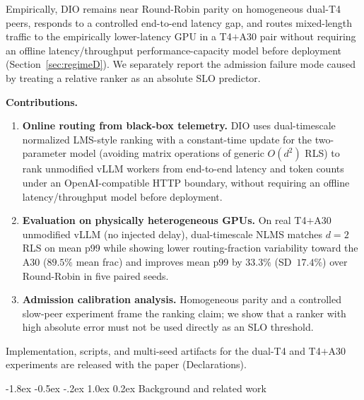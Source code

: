 \documentclass[pdflatex,sn-mathphys-num]{sn-jnl}
\makeatletter
\renewcommand{\paragraph}[1]{\par\smallskip\noindent\textbf{#1.}\ }
\renewcommand{\section}{\@startsection{section}{1}{\z@}%
  {-1.8ex \@plus -0.5ex \@minus -.2ex}%
  {1.0ex \@plus 0.2ex}%
  {\normalfont\large\bfseries}}%
\makeatother
\begin{document}
Empirically, DIO remains near Round-Robin parity on homogeneous dual-T4 peers,
responds to a controlled end-to-end latency gap, and routes mixed-length traffic
to the empirically lower-latency GPU in a T4$+$A30 pair without requiring an offline
latency/throughput performance-capacity model before deployment
(Section~\ref{sec:regimeD}). We separately report the admission failure mode caused
by treating a relative ranker as an absolute SLO predictor.

\paragraph{Contributions}
\begin{enumerate}
\item \textbf{Online routing from black-box telemetry.} DIO uses dual-timescale
normalized LMS-style ranking with a constant-time update for the two-parameter
model (avoiding matrix operations of generic $O(d^2)$ RLS) to rank unmodified
vLLM workers from end-to-end latency and token counts under an OpenAI-compatible
HTTP boundary, without requiring an offline latency/throughput model before
deployment.
\item \textbf{Evaluation on physically heterogeneous GPUs.} On real T4$+$A30
unmodified vLLM (no injected delay), dual-timescale NLMS matches $d{=}2$ RLS on
mean p99 while showing lower routing-fraction variability toward the A30
($89.5\%$ mean frac) and improves mean p99 by $33.3\%$ (SD~$17.4\%$) over
Round-Robin in five paired seeds.
\item \textbf{Admission calibration analysis.} Homogeneous parity and a controlled
slow-peer experiment frame the ranking claim; we show that a ranker with high
absolute error must not be used directly as an SLO threshold.
\end{enumerate}
\noindent Implementation, scripts, and multi-seed artifacts for the dual-T4 and
T4$+$A30 experiments are released with the paper (Declarations).

\section{Background and related work}
\label{sec:related}
\end{document}
